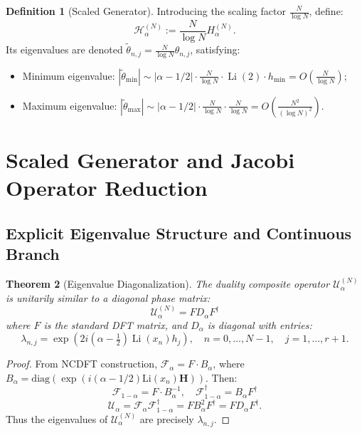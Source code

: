 \documentclass[12pt,a4paper]{amsart}
\theoremstyle{plain}
\newtheorem{theorem}{Theorem}[section]
\theoremstyle{definition}
\newtheorem{definition}[theorem]{Definition}
\theoremstyle{remark}
\DeclareMathOperator{\Li}{Li}
\begin{document}
\begin{definition}[Scaled Generator]\label{def:scaled_gen}
Introducing the scaling factor $\frac{N}{\log N}$, define:
\begin{equation}
\mathcal{H}_\alpha^{(N)} := \frac{N}{\log N} H_\alpha^{(N)}.
\end{equation}
Its eigenvalues are denoted $\tilde{\theta}_{n,j} = \frac{N}{\log N} \theta_{n,j}$, satisfying:
\begin{itemize}
    \item Minimum eigenvalue: $|\tilde{\theta}_{\min}| \sim |\alpha-1/2| \cdot \frac{N}{\log N} \cdot \Li(2) \cdot h_{\min} = O(\frac{N}{\log N})$;
    \item Maximum eigenvalue: $|\tilde{\theta}_{\max}| \sim |\alpha-1/2| \cdot \frac{N}{\log N} \cdot \frac{N}{\log N} = O(\frac{N^2}{(\log N)^2})$.
\end{itemize}
\end{definition}

\section{Scaled Generator and Jacobi Operator Reduction}

\subsection{Explicit Eigenvalue Structure and Continuous Branch}

\begin{theorem}[Eigenvalue Diagonalization]\label{thm:diagonalization}
The duality composite operator $\mathcal{U}_\alpha^{(N)}$ is unitarily similar to a diagonal phase matrix:
\begin{equation}
\mathcal{U}_\alpha^{(N)} = F D_\alpha F^\dagger
\end{equation}
where $F$ is the standard DFT matrix, and $D_\alpha$ is diagonal with entries:
\begin{equation}
\lambda_{n,j} = \exp\left(2i(\alpha-\tfrac{1}{2})\Li(x_n)h_j\right), \quad n=0,\dots,N-1, \quad j=1,\dots,r+1.
\end{equation}
\end{theorem}

\begin{proof}
From NCDFT construction, $\mathcal{F}_\alpha = F \cdot B_\alpha$, where $B_\alpha = \mathrm{diag}(\exp(i(\alpha-1/2)\mathrm{Li}(x_n)\mathbf{H}))$. Then:
\begin{equation}
\mathcal{F}_{1-\alpha} = F \cdot B_\alpha^{-1}, \quad \mathcal{F}_{1-\alpha}^\dagger = B_\alpha F^\dagger
\end{equation}
\begin{equation}
\mathcal{U}_\alpha = \mathcal{F}_\alpha\mathcal{F}_{1-\alpha}^\dagger = F B_\alpha^2 F^\dagger = F D_\alpha F^\dagger.
\end{equation}
Thus the eigenvalues of $\mathcal{U}_\alpha^{(N)}$ are precisely $\lambda_{n,j}$.
\end{proof}
\end{document}
